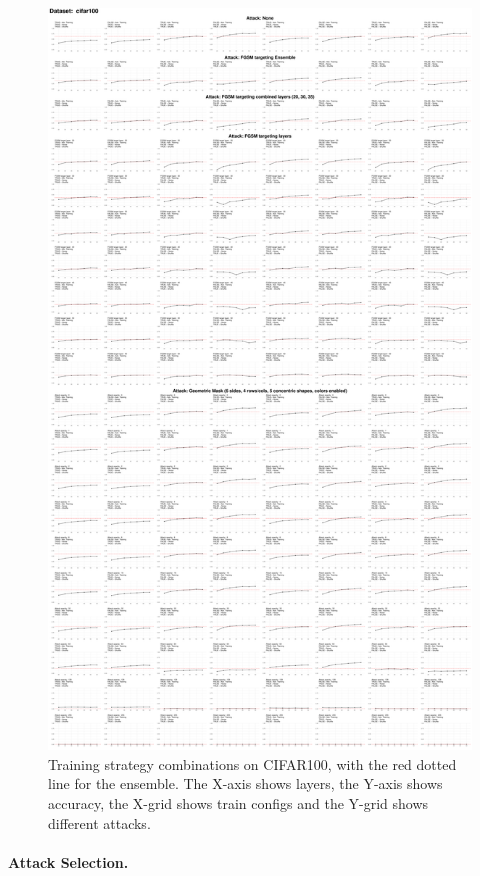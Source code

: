 \documentclass[a4paper, oneside]{discothesis}
\begin{document}
\begin{figure}
	\centering
	\includegraphics[width=\textwidth,height=\textheight,keepaspectratio]{figures/self_ensemble_8train_cifar100.pdf}
	\caption{Training strategy combinations on CIFAR100, with the red dotted line for the ensemble. The X-axis shows layers, the Y-axis shows accuracy, the X-grid shows train configs and the Y-grid shows different attacks.}
	\label{fig:8train-cifar100}
\end{figure}

\paragraph{Attack Selection.}
\end{document}
